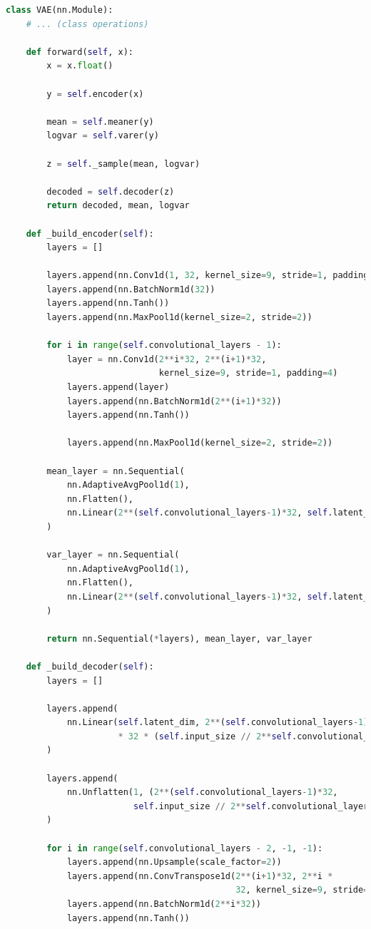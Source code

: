 \begin{lstlisting}[language=Python]
class VAE(nn.Module):
    # ... (class operations)

    def forward(self, x):
        x = x.float()

        y = self.encoder(x)

        mean = self.meaner(y)
        logvar = self.varer(y)

        z = self._sample(mean, logvar)

        decoded = self.decoder(z)
        return decoded, mean, logvar

    def _build_encoder(self):
        layers = []

        layers.append(nn.Conv1d(1, 32, kernel_size=9, stride=1, padding=4))
        layers.append(nn.BatchNorm1d(32))
        layers.append(nn.Tanh())
        layers.append(nn.MaxPool1d(kernel_size=2, stride=2))

        for i in range(self.convolutional_layers - 1):
            layer = nn.Conv1d(2**i*32, 2**(i+1)*32,
                              kernel_size=9, stride=1, padding=4)
            layers.append(layer)
            layers.append(nn.BatchNorm1d(2**(i+1)*32))
            layers.append(nn.Tanh())

            layers.append(nn.MaxPool1d(kernel_size=2, stride=2))

        mean_layer = nn.Sequential(
            nn.AdaptiveAvgPool1d(1),
            nn.Flatten(),
            nn.Linear(2**(self.convolutional_layers-1)*32, self.latent_dim)
        )

        var_layer = nn.Sequential(
            nn.AdaptiveAvgPool1d(1),
            nn.Flatten(),
            nn.Linear(2**(self.convolutional_layers-1)*32, self.latent_dim)
        )

        return nn.Sequential(*layers), mean_layer, var_layer

    def _build_decoder(self):
        layers = []

        layers.append(
            nn.Linear(self.latent_dim, 2**(self.convolutional_layers-1)
                      * 32 * (self.input_size // 2**self.convolutional_layers))
        )

        layers.append(
            nn.Unflatten(1, (2**(self.convolutional_layers-1)*32,
                         self.input_size // 2**self.convolutional_layers))
        )

        for i in range(self.convolutional_layers - 2, -1, -1):
            layers.append(nn.Upsample(scale_factor=2))
            layers.append(nn.ConvTranspose1d(2**(i+1)*32, 2**i *
                                             32, kernel_size=9, stride=1, padding=4))
            layers.append(nn.BatchNorm1d(2**i*32))
            layers.append(nn.Tanh())


\end{lstlisting}
